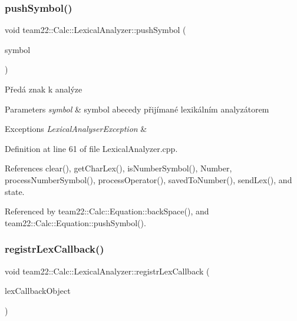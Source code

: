 \subsubsection{\texorpdfstring{push\+Symbol()}{pushSymbol()}}
{\footnotesize\ttfamily void team22\+::\+Calc\+::\+Lexical\+Analyzer\+::push\+Symbol (\begin{DoxyParamCaption}\item[{char}]{symbol }\end{DoxyParamCaption})}

Předá znak k analýze 
\begin{DoxyParams}{Parameters}
{\em symbol} & symbol abecedy přijímané lexikálním analyzátorem \\
\hline
\end{DoxyParams}

\begin{DoxyExceptions}{Exceptions}
{\em Lexical\+Analyser\+Exception} & \\
\hline
\end{DoxyExceptions}


Definition at line 61 of file Lexical\+Analyzer.\+cpp.



References clear(), get\+Char\+Lex(), is\+Number\+Symbol(), Number, process\+Number\+Symbol(), process\+Operator(), saved\+To\+Number(), send\+Lex(), and state.



Referenced by team22\+::\+Calc\+::\+Equation\+::back\+Space(), and team22\+::\+Calc\+::\+Equation\+::push\+Symbol().

\mbox{\label{classteam22_1_1_calc_1_1_lexical_analyzer_ae7fb3f4ce9e6020215352c0c9e2b8245}} 
\subsubsection{\texorpdfstring{registr\+Lex\+Callback()}{registrLexCallback()}}
{\footnotesize\ttfamily void team22\+::\+Calc\+::\+Lexical\+Analyzer\+::registr\+Lex\+Callback (\begin{DoxyParamCaption}\item[{\hyperlink{classteam22_1_1_calc_1_1_lex_identification_observer}{Lex\+Identification\+Observer} $\ast$}]{lex\+Callback\+Object }\end{DoxyParamCaption})}

